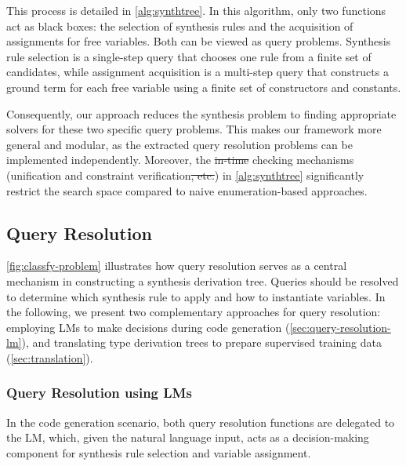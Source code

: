 \documentclass[manuscript,screen]{acmart}
\makeatletter
\providecommand{\DIFadd}[1]{{\protect\color{blue}\uwave{#1}}} %
\providecommand{\DIFdel}[1]{{\protect\color{red}\sout{#1}}} %
\providecommand{\DIFaddbegin}{} %
\providecommand{\DIFaddend}{} %
\providecommand{\DIFdelbegin}{} %
\providecommand{\DIFdelend}{} %
\providecommand{\DIFscaledelfig}{0.5}
\newlength{\DIFdelgraphicswidth} %
\newlength{\DIFdelgraphicsheight} %
\providecommand{\DIFaddincludegraphics}[2][]{{\color{blue}\fbox{\DIFOincludegraphics[#1]{#2}}}} %
\providecommand{\DIFdelincludegraphics}[2][]{%
\sbox{\DIFdelgraphicsbox}{\DIFOincludegraphics[#1]{#2}}%
\settoboxwidth{\DIFdelgraphicswidth}{\DIFdelgraphicsbox} %
\settoboxtotalheight{\DIFdelgraphicsheight}{\DIFdelgraphicsbox} %
\scalebox{\DIFscaledelfig}{%
\parbox[b]{\DIFdelgraphicswidth}{\usebox{\DIFdelgraphicsbox}\\[-\baselineskip] \rule{\DIFdelgraphicswidth}{0em}}\llap{\resizebox{\DIFdelgraphicswidth}{\DIFdelgraphicsheight}{%
\setlength{\unitlength}{\DIFdelgraphicswidth}%
\begin{picture}(1,1)%
\thicklines\linethickness{2pt} %
{\color[rgb]{1,0,0}\put(0,0){\framebox(1,1){}}}%
{\color[rgb]{1,0,0}\put(0,0){\line( 1,1){1}}}%
{\color[rgb]{1,0,0}\put(0,1){\line(1,-1){1}}}%
\end{picture}%
}\hspace*{3pt}}} %
} %
\DeclareRobustCommand{\DIFaddbegin}{\DIFOaddbegin \let\includegraphics\DIFaddincludegraphics} %
\DeclareRobustCommand{\DIFaddend}{\DIFOaddend \let\includegraphics\DIFOincludegraphics} %
\DeclareRobustCommand{\DIFdelbegin}{\DIFOdelbegin \let\includegraphics\DIFdelincludegraphics} %
\DeclareRobustCommand{\DIFdelend}{\DIFOaddend \let\includegraphics\DIFOincludegraphics} %
\let\sout@orig\sout %
\renewcommand{\sout}[1]{\ifmmode\text{\sout@orig{\ensuremath{#1}}}\else\sout@orig{#1}\fi} %
\makeatother
\begin{document}
This process is detailed in \autoref{alg:synthtree}. In this algorithm, only two functions act as black boxes: the selection of synthesis rules and the acquisition of assignments for free variables. Both can be viewed as query problems. Synthesis rule selection is a single-step query that chooses one rule from a finite set of candidates, while assignment acquisition is a multi-step query that constructs a ground term for each free variable using a finite set of constructors and constants.

Consequently, our approach reduces the synthesis problem to finding appropriate solvers for these two specific query problems. This makes our framework more general and modular, as the extracted query resolution problems can be implemented independently. 
Moreover, the \DIFdelbegin \DIFdel{in-time }\DIFdelend \DIFaddbegin \DIFadd{online }\DIFaddend checking mechanisms (unification and constraint verification\DIFdelbegin \DIFdel{, etc.}\DIFdelend ) in \autoref{alg:synthtree} significantly restrict the search space compared to naive enumeration-based approaches. 

\subsection{Query Resolution}
\autoref{fig:classfy-problem} illustrates how query resolution serves as a central mechanism in constructing a synthesis derivation tree. Queries should be resolved to determine which synthesis rule to apply and how to instantiate variables. In the following, we present two complementary approaches for query resolution: employing LMs to make decisions during code generation (\autoref{sec:query-resolution-lm}), and translating type derivation trees to prepare supervised training data (\autoref{sec:translation}).

\subsubsection{Query Resolution using LMs}
\label{sec:query-resolution-lm}
In the code generation scenario, both query resolution functions are delegated to the LM, which, given the natural language input, acts as a decision-making component for synthesis rule selection and variable assignment.
\end{document}
